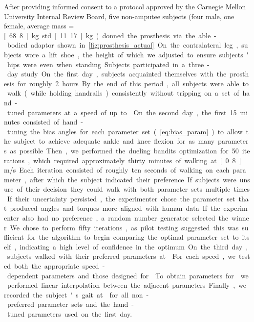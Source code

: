 After providing informed consent to a protocol approved by the Carnegie Mellon
University Internal Review Board, five non-amputee subjects (four male, one
female, average mass = \unit[68.8]{kg} std \unit[11.17]{kg}) donned the
prosthesis via the able-bodied adaptor shown in \cref{fig:prosthesis_actual}. On
the contralateral leg, subjects wore a lift shoe, the height of which we
adjusted to ensure subjects' hips were even when standing.

Subjects participated in a three-day study. On the first day, subjects
acquainted themselves with the prosthesis for roughly 2 hours. By the end of
this period, all subjects were able to walk (while holding handrails)
consistently without tripping on a set of hand-tuned parameters at a speed of up
to . On the second day, the first 15 minutes consisted of
hand-tuning the bias angles for each parameter set (\cref{eq:bias_param}) to
allow the subject to achieve adequate ankle and knee flexion for as many
parameters as possible. Then, we performed the dueling bandits optimization for
50 iterations, which required approximately thirty minutes of walking at
\unit[0.8]{m/s}. Each iteration consisted of roughly ten seconds of walking on
each parameter, after which the subject indicated their preference. If subjects
were unsure of their decision they could walk with both parameter sets multiple
times. If their uncertainty persisted, the experimenter chose the parameter set
that produced angles and torques more aligned with human data.  If the
experimenter also had no preference, a random number generator selected the
winner. We chose to perform fifty iterations, as pilot testing suggested this
was sufficient for the algorithm to begin comparing the optimal parameter set to
itself, indicating a high level of confidence in the optimum.

On the third day, subjects walked with their preferred parameters at
. For each speed, we tested both the
appropriate speed-dependent parameters and those designed for
. To obtain parameters for  we
performed linear interpolation between the adjacent parameters.  Finally, we
recorded the subject's gait at  for all non-preferred
parameter sets and the hand-tuned parameters used on the first day. 
